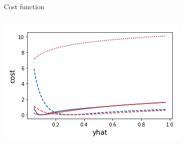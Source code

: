\begin{frame}{Cost function}
\begin{columns}[c]
    \includegraphics[width=\textwidth, trim=20 0 20 0]{images/Asym_CostPlot_190302_linearA.png}
    \end{columns}
\end{frame}
